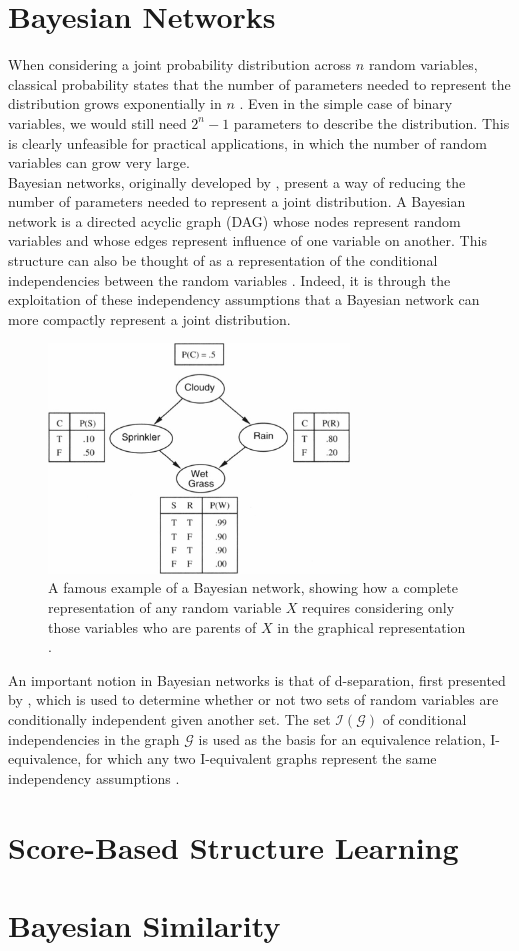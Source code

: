 \documentclass [11pt]{article}
\begin{document}
\section{Bayesian Networks}\label{BayesianNetworks}
When considering a joint probability distribution across $n$ random variables, classical probability states that the number of parameters needed to represent the distribution grows exponentially in $n$ \citep{koller09}. Even in the simple case of binary variables, we would still need $2^n -1$ parameters to describe the distribution. This is clearly unfeasible for practical applications, in which the number of random variables can grow very large. 
\\
Bayesian networks, originally developed by \citet{pearl88}, present a way of reducing the number of parameters needed to represent a joint distribution. A Bayesian network is a directed acyclic graph (DAG) whose nodes represent random variables and whose edges represent influence of one variable on another. This structure can also be thought of as a representation of the conditional independencies between the random variables \citep{koller09}. Indeed, it is through the exploitation of these independency assumptions that a Bayesian network can more compactly represent a joint distribution.
\begin{figure}[H]\label{fig:sprinkler}
\centering
\caption{A famous example of a Bayesian network, showing how a complete representation of any random variable $X$ requires considering only those variables who are parents of $X$ in the graphical representation \citep{norvig94}.}
\includegraphics[width=8cm]{sprinkler.jpg}
\end{figure}
An important notion in Bayesian networks is that of d-separation, first presented by \citet{pearl86}, which is used to determine whether or not two sets of random variables are conditionally independent given another set. The set $\mathcal{I}(\mathcal{G})$ of conditional independencies in the graph $\mathcal{G}$ is used as the basis for an equivalence relation, I-equivalence, for which any two I-equivalent graphs represent the same independency assumptions \citep{verma91}.
\section{Score-Based Structure Learning}\label{ScoreBasedStructureLearning}
\section{Bayesian Similarity}\label{BayesianSimilarity}


\end{document}
